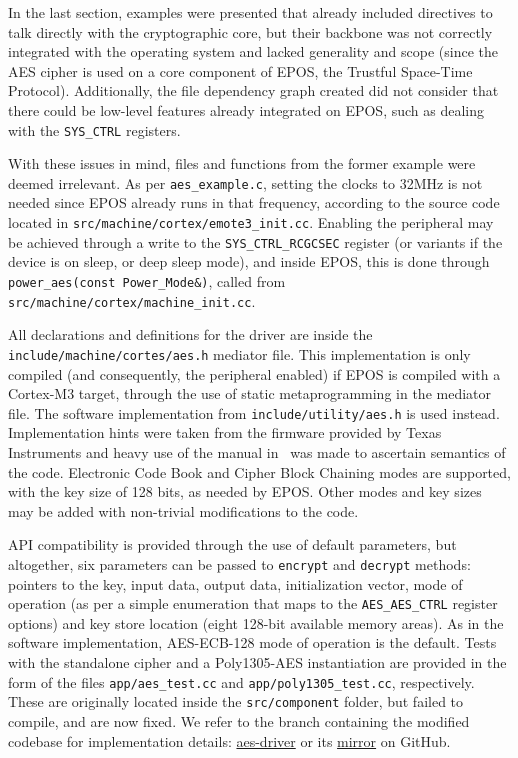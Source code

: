 \documentclass{../sftex/sftex}
\begin{document}
In the last section, examples were presented that already included directives
to talk directly with the cryptographic core, but their backbone was not
correctly integrated with the operating system and lacked generality and scope
(since the AES cipher is used on a core component of EPOS, the Trustful
Space-Time Protocol). Additionally, the file dependency graph created did not
consider that there could be low-level features already integrated on EPOS,
such as dealing with the \verb!SYS_CTRL! registers.

With these issues in mind, files and functions from the former example were
deemed irrelevant. As per \verb!aes_example.c!, setting the clocks to 32MHz is
not needed since EPOS already runs in that frequency, according to the source
code located in \verb!src/machine/cortex/emote3_init.cc!. Enabling the
peripheral may be achieved through a write to the \verb!SYS_CTRL_RCGCSEC!
register (or variants if the device is on sleep, or deep sleep mode), and
inside EPOS, this is done through \verb!power_aes(const Power_Mode&)!, called
from \verb!src/machine/cortex/machine_init.cc!.

All declarations and definitions for the driver are inside the
\verb!include/machine/cortes/aes.h! mediator file. This implementation is only
compiled (and consequently, the peripheral enabled) if EPOS is compiled with a
Cortex-M3 target, through the use of static metaprogramming in the mediator
file. The software implementation from \verb!include/utility/aes.h! is used
instead. Implementation hints were taken from the firmware provided by Texas
Instruments and heavy use of the manual in~\cite{Texas:report:2013:may} was
made to ascertain semantics of the code. Electronic Code Book and Cipher Block
Chaining modes are supported, with the key size of 128 bits, as needed by
EPOS\@. Other modes and key sizes may be added with non-trivial modifications
to the code.

API compatibility is provided through the use of default parameters, but
altogether, six parameters can be passed to \verb!encrypt! and \verb!decrypt!
methods: pointers to the key, input data, output data, initialization vector,
mode of operation (as per a simple enumeration that maps to the
\verb!AES_AES_CTRL! register options) and key store location (eight 128-bit
available memory areas). As in the software implementation, AES-ECB-128 mode of
operation is the default. Tests with the standalone cipher and a Poly1305-AES
instantiation are provided in the form of the files \verb!app/aes_test.cc! and
\verb!app/poly1305_test.cc!, respectively. These are originally located inside
the \verb!src/component! folder, but failed to compile, and are now fixed. We
refer to the branch containing the modified codebase for implementation
details: \href{https://epos.lisha.ufsc.br/svn/makers/aes-driver/}{aes-driver}
or its \href{https://github.com/zambonin/epos-aes-driver}{mirror} on GitHub.
\end{document}
